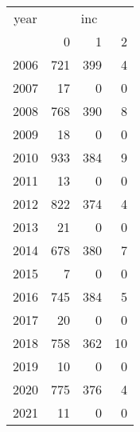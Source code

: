 \footnotesize\begin{tabular}[t]{lrrr}
\toprule
\multicolumn{1}{c}{year} & \multicolumn{3}{c}{inc} \\
\cmidrule(l{3pt}r{3pt}){1-1} \cmidrule(l{3pt}r{3pt}){2-4}
  & 0 & 1 & 2\\
\midrule
2006 & 721 & 399 & 4\\
2007 & 17 & 0 & 0\\
2008 & 768 & 390 & 8\\
2009 & 18 & 0 & 0\\
2010 & 933 & 384 & 9\\
2011 & 13 & 0 & 0\\
2012 & 822 & 374 & 4\\
2013 & 21 & 0 & 0\\
2014 & 678 & 380 & 7\\
2015 & 7 & 0 & 0\\
2016 & 745 & 384 & 5\\
2017 & 20 & 0 & 0\\
2018 & 758 & 362 & 10\\
2019 & 10 & 0 & 0\\
2020 & 775 & 376 & 4\\
2021 & 11 & 0 & 0\\
\bottomrule
\end{tabular}
